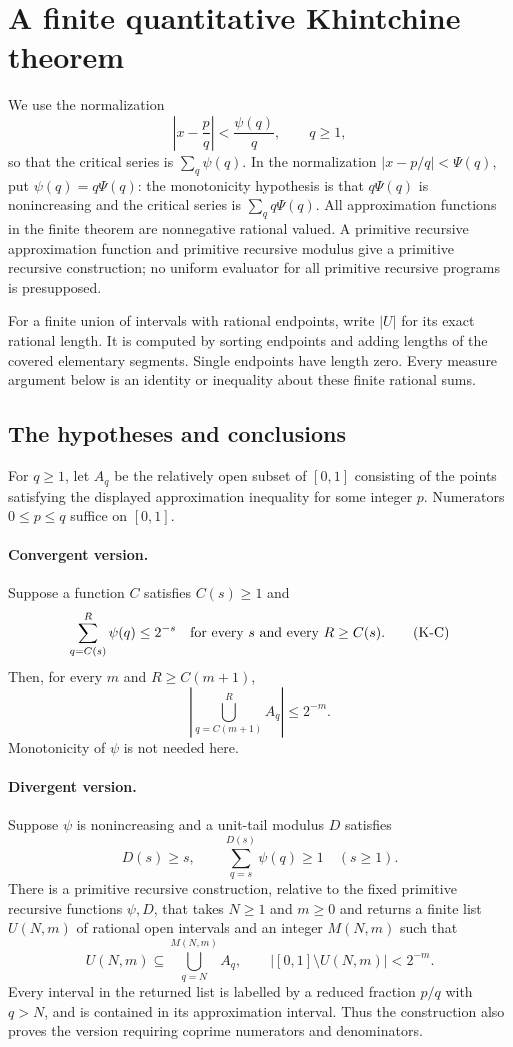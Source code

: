 \section{A finite quantitative Khintchine theorem}
\label{sec:finite-khintchine}

We use the normalization
\[
 \left|x-\frac pq\right|<\frac{\psi(q)}q,
 \qquad q\geq1,
\]
so that the critical series is $\sum_q\psi(q)$.  In the normalization
$|x-p/q|<\Psi(q)$, put $\psi(q)=q\Psi(q)$: the monotonicity hypothesis is
that $q\Psi(q)$ is nonincreasing and the critical series is
$\sum_q q\Psi(q)$.  All approximation functions in the finite theorem
are nonnegative rational valued.  A primitive recursive approximation
function and primitive recursive modulus give a primitive recursive
construction; no uniform evaluator for all primitive recursive programs
is presupposed.

For a finite union of intervals with rational endpoints, write $|U|$ for
its exact rational length.  It is computed by sorting endpoints and adding
lengths of the covered elementary segments.  Single endpoints have length
zero.  Every measure argument below is an identity or inequality about
these finite rational sums.

\subsection{The hypotheses and conclusions}

For $q\geq1$, let $A_q$ be the relatively open subset of $[0,1]$ consisting
of the points satisfying the displayed approximation inequality for some
integer $p$.  Numerators $0\leq p\leq q$ suffice on $[0,1]$.

\paragraph{Convergent version.}
Suppose a function $C$ satisfies $C(s)\ge1$ and
\[
 \sum_{q=C(s)}^R\psi(q)\leq2^{-s}
 \quad\hbox{for every }s\hbox{ and every }R\geq C(s).
 \tag{K-C}
\]
Then, for every $m$ and $R\geq C(m+1)$,
\[
 \left|\bigcup_{q=C(m+1)}^R A_q\right|\leq2^{-m}.
 \tag{K1}
\]
Monotonicity of $\psi$ is not needed here.

\paragraph{Divergent version.}
Suppose $\psi$ is nonincreasing and a unit-tail modulus $D$ satisfies
\[
 D(s)\geq s,\qquad
 \sum_{q=s}^{D(s)}\psi(q)\geq1 \quad(s\geq1).
 \tag{K-D}
\]
There is a primitive recursive construction, relative to the fixed
primitive recursive functions $\psi,D$, that takes $N\geq1$ and $m\geq0$
and returns a finite list $U(N,m)$ of rational open intervals and an integer
$M(N,m)$ such that
\[
 U(N,m)\subseteq\bigcup_{q=N}^{M(N,m)}A_q,
 \qquad |[0,1]\setminus U(N,m)|<2^{-m}.
 \tag{K2}
\]
Every interval in the returned list is labelled by a reduced fraction
$p/q$ with $q>N$, and is contained in its approximation interval.  Thus the
construction also proves the version requiring coprime numerators and
denominators.

